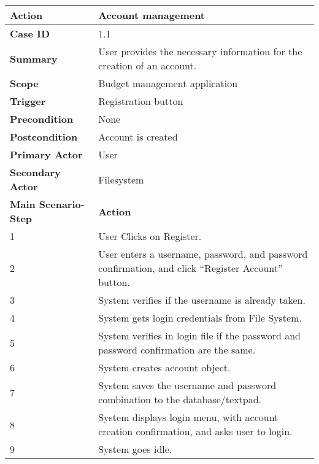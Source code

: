 \documentclass[letterpaper]{article}
\begin{document}
        \begin{center}
        \begin{tabular}{ | m{5cm} | m{10cm}| } 
            \hline
            \textbf{Action} & Account management \\ 
            \hline
            \textbf{Case ID} & 1.1 \\ 
            \hline
            \textbf{Summary} & User provides the necessary information for the creation of an account. \\
            \hline
            \textbf{Scope} & Budget management application \\ 
            \hline
            \textbf{Trigger} & Registration button \\
            \hline
            \textbf{Precondition} & None \\ 
            \hline
            \textbf{Postcondition} & Account is created \\ 
            \hline
            \textbf{Primary Actor} & User \\ 
            \hline
            \textbf{Secondary Actor} & Filesystem \\ 
            \hline
            \textbf{Main Scenario-Step} & \textbf{Action} \\ 
            \hline
            1 & User Clicks on Register. \\ 
            \hline
            2 & User enters a username, password, and password confirmation, and click “Register Account” button. \\ 
            \hline
            3 & System verifies if the username is already taken. \\ 
            \hline
            4 & System gets login credentials from File System. \\ 
            \hline
            5 & System verifies in login file if the password and password confirmation are the same. \\ 
            \hline
            6 & System creates account object. \\ 
            \hline
            7 & System saves the username and password combination to the database/textpad. \\
            \hline
            8 & System displays login menu, with account creation confirmation, and asks user to login. \\ 
            \hline
            9 & System goes idle. \\ 
            \hline
        \end{tabular}
        \end{center}
        
\end{document}
